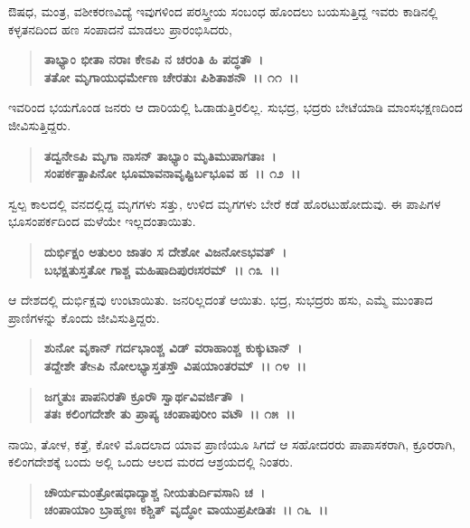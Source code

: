 ಔಷಧ, ಮಂತ್ರ, ವಶೀಕರಣವಿದ್ಯೆ ಇವುಗಳಿಂದ ಪರಸ್ತ್ರೀಯ ಸಂಬಂಧ ಹೊಂದಲು ಬಯಸುತ್ತಿದ್ದ ಇವರು ಕಾಡಿನಲ್ಲಿ ಕಳ್ಳತನದಿಂದ ಹಣ ಸಂಪಾದನೆ ಮಾಡಲು ಪ್ರಾರಂಭಿಸಿದರು,

\begin{verse}
\textbf{ತಾಭ್ಯಾಂ ಭೀತಾ ನರಾಃ ಕೇಽಪಿ ನ ಚರಂತಿ ಹಿ ಪದ್ಧತೌ~।}\\\textbf{ತತೋ ಮೃಗಾಯುಧರ್ಮೇಣ ಚೇರತುಃ ಪಿಶಿತಾಶನೌ~।। ೧೧~।।}
\end{verse}

ಇವರಿಂದ ಭಯಗೊಂಡ ಜನರು ಆ ದಾರಿಯಲ್ಲಿ ಓಡಾಡುತ್ತಿರಲಿಲ್ಲ. ಸುಭದ್ರ, ಭದ್ರರು ಬೇಟೆಯಾಡಿ ಮಾಂಸಭಕ್ಷಣದಿಂದ ಜೀವಿಸುತ್ತಿದ್ದರು.

\begin{verse}
\textbf{ತದ್ವನೇಽಪಿ ಮೃಗಾ ನಾಸನ್ ತಾಭ್ಯಾಂ ಮೃತಿಮುಪಾಗತಾಃ~।}\\\textbf{ಸಂಪರ್ಕತ್ಪಾಪಿನೋ ಭೂಮಾವನಾವೃಷ್ಟಿರ್ಬಭೂವ ಹ~।। ೧೨~।।}
\end{verse}

ಸ್ವಲ್ಪ ಕಾಲದಲ್ಲಿ ವನದಲ್ಲಿದ್ದ ಮೃಗಗಳು ಸತ್ತು, ಉಳಿದ ಮೃಗಗಳು ಬೇರೆ ಕಡೆ ಹೊರಟುಹೋದುವು. ಈ ಪಾಪಿಗಳ ಭೂಸಂಪರ್ಕದಿಂದ ಮಳೆಯೇ ಇಲ್ಲದಂತಾಯಿತು.

\begin{verse}
\textbf{ದುರ್ಭಿಕ್ಷಂ ಅತುಲಂ ಜಾತಂ ಸ ದೇಶೋ ವಿಜನೋಽಭವತ್~।}\\\textbf{ಬಭಕ್ಷತುಸ್ತತೋ ಗಾಶ್ಚ ಮಹಿಷಾದಿಪುರಃಸರಮ್~।। ೧೩~।।}
\end{verse}

ಆ ದೇಶದಲ್ಲಿ ದುರ್ಭಿಕ್ಷವು ಉಂಟಾಯಿತು. ಜನರಿಲ್ಲದಂತೆ ಆಯಿತು. ಭದ್ರ, ಸುಭದ್ರರು ಹಸು, ಎಮ್ಮೆ ಮುಂತಾದ ಪ್ರಾಣಿಗಳನ್ನು ಕೊಂದು ಜೀವಿಸುತ್ತಿದ್ದರು.

\begin{verse}
\textbf{ಶುನೋ ವೃಕಾನ್ ಗರ್ದಭಾಂಶ್ಚ ವಿಡ್ ವರಾಹಾಂಶ್ಚ ಕುಕ್ಕುಟಾನ್~।}\\\textbf{ತದ್ದೇಶೇ ತೇsಪಿ ನೋಲಭ್ಯಾಸ್ತತಸ್ತೌ ವಿಷಯಾಂತರಮ್~।। ೧೪~।। }
\end{verse}

\begin{verse}
\textbf{ಜಗ್ಮತುಃ ಪಾಪನಿರತೌ ಕ್ರೂರೌ ಸ್ವಾರ್ಥವಿವರ್ಜಿತೌ~।}\\\textbf{ತತಃ ಕಲಿಂಗದೇಶೇ ತು ಪ್ರಾಪ್ಯ ಚಂಪಾಪುರೀಂ ವಟೌ~।। ೧೫~।।}
\end{verse}

ನಾಯಿ, ತೋಳ, ಕತ್ತೆ, ಕೋಳಿ ಮೊದಲಾದ ಯಾವ ಪ್ರಾಣಿಯೂ ಸಿಗದೆ ಆ ಸಹೋದರರು ಪಾಪಾಸಕರಾಗಿ, ಕ್ರೂರರಾಗಿ, ಕಲಿಂಗದೇಶಕ್ಕೆ ಬಂದು ಅಲ್ಲಿ ಒಂದು ಆಲದ ಮರದ ಆಶ್ರಯದಲ್ಲಿ ನಿಂತರು.

\begin{verse}
\textbf{ಚೌರ್ಯಮಂತ್ರೋಷಧಾದ್ಯಾಶ್ಚ ನೀಯತುರ್ದಿವಸಾನಿ ಚ~।}\\\textbf{ಚಂಪಾಯಾಂ ಬ್ರಾಹ್ಮಣಃ ಕಶ್ಚಿತ್ ವೃದ್ಧೋ ವಾಯುಪ್ರಪೀಡಿತಃ~।। ೧೬~।।}
\end{verse}

